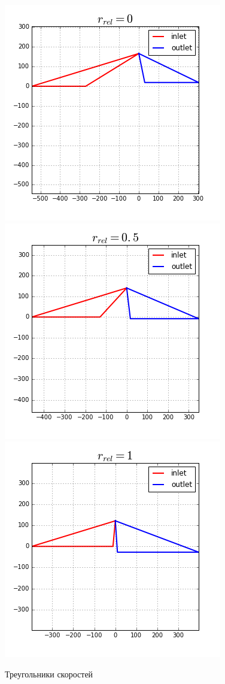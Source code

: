\documentclass[a4paper,10pt]{article}
\begin{document}
\begin{figure}[hbtp]
\centering
\includegraphics[scale=0.5]{../../plots/st1_triangles_0.png}
\includegraphics[scale=0.5]{../../plots/st1_triangles_1.png}
\includegraphics[scale=0.5]{../../plots/st1_triangles_2.png}
\caption{Треугольники скоростей}
\end{figure}
\end{document}
